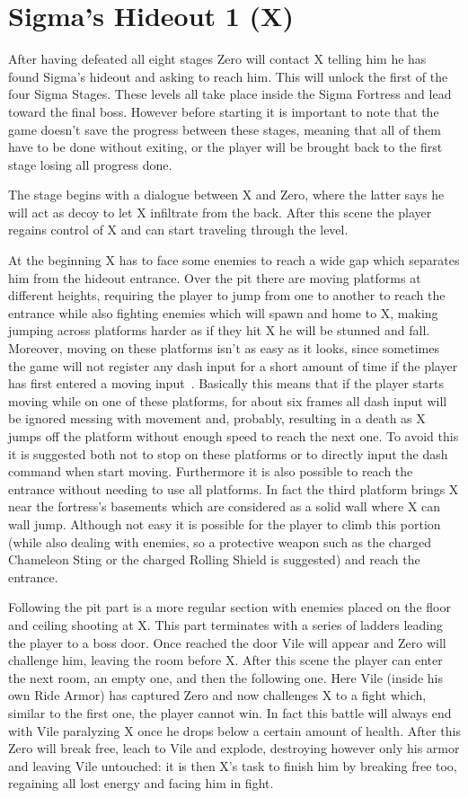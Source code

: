 \section{Sigma's Hideout 1 (X)}
After having defeated all eight stages Zero will contact X telling him he has found Sigma's hideout and asking to reach him. This will unlock the first of the four Sigma Stages. These levels all take place inside the Sigma Fortress and lead toward the final boss. However before starting it is important to note that the game doesn't save the progress between these stages, meaning that all of them have to be done without exiting, or the player will be brought back to the first stage losing all progress done.

The stage begins with a dialogue between X and Zero, where the latter says he will act as decoy to let X infiltrate from the back. After this scene the player regains control of X and can start traveling through the level. 

At the beginning X has to face some enemies to reach a wide gap which separates him from the hideout entrance. Over the pit there are moving platforms at different heights, requiring the player to jump from one to another to reach the entrance while also fighting enemies which will spawn and home to X, making jumping across platforms harder as if they hit X he will be stunned and fall. Moreover, moving on these platforms isn't as easy as it looks, since sometimes the game will not register any dash input for a short amount of time if the player has first entered a moving input~\cite{RTA_wiki:X1}. Basically this means that if the player starts moving while on one of these platforms, for about six frames all dash input will be ignored messing with movement and, probably, resulting in a death as X jumps off the platform without enough speed to reach the next one. To avoid this it is suggested both not to stop on these platforms or to directly input the dash command when start moving. Furthermore it is also possible to reach the entrance without needing to use all platforms. In fact the third platform brings X near the fortress's basements which are considered as a solid wall where X can wall jump. Although not easy it is possible for the player to climb this portion (while also dealing with enemies, so a protective weapon such as the charged Chameleon Sting or the charged Rolling Shield is suggested) and reach the entrance.

Following the pit part is a more regular section with enemies placed on the floor and ceiling shooting at X. This part terminates with a series of ladders leading the player to a boss door. Once reached the door Vile will appear and Zero will challenge him, leaving the room before X. After this scene the player can enter the next room, an empty one, and then the following one. Here Vile (inside his own Ride Armor) has captured Zero and now challenges X to a fight which, similar to the first one, the player cannot win. In fact this battle will always end with Vile paralyzing X once he drops below a certain amount of health. After this Zero will break free, leach to Vile and explode, destroying however only his armor and leaving Vile untouched: it is then X's task to finish him by breaking free too, regaining all lost energy and facing him in fight.

